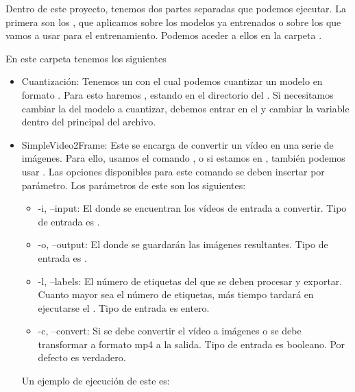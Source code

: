 Dentro de este proyecto, tenemos dos partes separadas que podemos ejecutar. La primera son los , que aplicamos sobre los modelos ya entrenados o sobre los  que vamos a usar para el entrenamiento. Podemos aceder a ellos en la carpeta .

En este carpeta tenemos los siguientes 

\begin{itemize}
  \item Cuantización: Tenemos un  con el cual podemos cuantizar un modelo en formato . Para esto haremos , estando en el directorio del .
        Si necesitamos cambiar la  del modelo a cuantizar, debemos entrar en el  y cambiar la variable dentro del  principal del archivo.

  \item SimpleVideo2Frame: Este  se encarga de convertir un vídeo en una serie de imágenes. Para ello, usamos el comando , o si estamos en , también podemos usar . Las opciones disponibles para este comando se deben insertar por parámetro. Los parámetros de este  son los siguientes:
        \begin{itemize}
          \item -i, --input: El  donde se encuentran los vídeos de entrada a convertir. Tipo de entrada es .
          \item -o, --output: El  donde se guardarán las imágenes resultantes. Tipo de entrada es .
          \item -l, --labels: El número de etiquetas del  que se deben procesar y exportar. Cuanto mayor sea el número de etiquetas, más tiempo tardará en ejecutarse el . Tipo de entrada es entero.
          \item -c, --convert: Si se debe convertir el vídeo a imágenes o se debe transformar a formato mp4 a la salida. Tipo de entrada es booleano. Por defecto es verdadero.
        \end{itemize}

        Un ejemplo de ejecución de este  es:  


\end{itemize}
